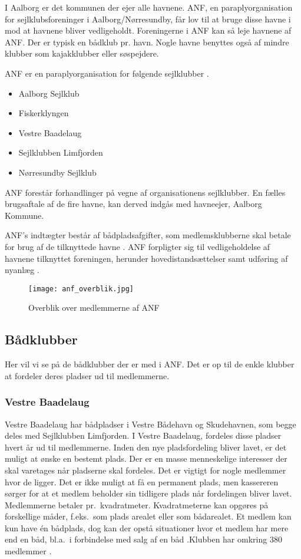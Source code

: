 I Aalborg er det kommunen der ejer alle havnene. ANF, en paraplyorganisation for sejlklubsforeninger i Aalborg/Nørresundby, får lov til at bruge disse havne i mod at havnene bliver vedligeholdt. Foreningerne i ANF kan så leje havnene af ANF. Der er typisk en bådklub pr. havn. Nogle havne benyttes også af mindre klubber som kajakklubber eller søspejdere.

ANF er en paraplyorganisation for følgende sejlklubber \cite{anf_havnereglement}.
\begin{itemize}[noitemsep]
	\item Aalborg Sejlklub
	\item Fiskerklyngen
	\item Vestre Baadelaug
	\item Sejlklubben Limfjorden
	\item Nørresundby Sejlklub
\end{itemize}
 
ANF forestår forhandlinger på vegne af organisationens sejlklubber. En fælles brugsaftale af de fire havne, kan derved indgås med havneejer, Aalborg Kommune.

ANF's indtægter består af bådpladsafgifter, som medlemsklubberne skal betale for brug af de tilknyttede havne \cite{anf_budget_2013}. ANF forpligter sig til vedligeholdelse af havnene tilknyttet foreningen, herunder hovedistandsættelser samt udføring af nyanlæg \cite{anf_brugsaftale_2012}.

\begin{figure}
  \centering
  \texttt{[image: anf\_overblik.jpg]}
 	\caption{Overblik over medlemmerne af ANF} 	\label{fig:anf_overblik}
\end{figure}



\subsection{Bådklubber}
Her vil vi se på de bådklubber der er med i ANF. Det er op til de enkle klubber at fordeler deres pladser ud til medlemmerne. 

\subsubsection{Vestre Baadelaug}
Vestre Baadelaug har bådpladser i Vestre Bådehavn og Skudehavnen, som begge deles med Sejlklubben Limfjorden. I Vestre Baadelaug, fordeles disse pladser hvert år ud til medlemmerne. Inden den nye pladsfordeling bliver lavet, er det muligt at ønske en bestemt plads. Der er en masse menneskelige interesser der skal varetages når pladserne skal fordeles. Det er vigtigt for nogle medlemmer hvor de ligger. Det er ikke muligt at få en permanent plads, men kassereren sørger for at et medlem beholder sin tidligere plads når fordelingen bliver lavet. Medlemmerne betaler pr.\ kvadratmeter. Kvadratmeterne kan opgøres på forskellige måder, f.eks.\ som plads arealet eller som bådarealet. Et medlem kan kun have én bådplads, dog kan der opstå situationer hvor et medlem har mere end en båd, bl.a.\ i forbindelse med salg af en båd \cite{int_vb_sl}.Klubben har omkring 380 medlemmer \cite{int_vb_sl}.

